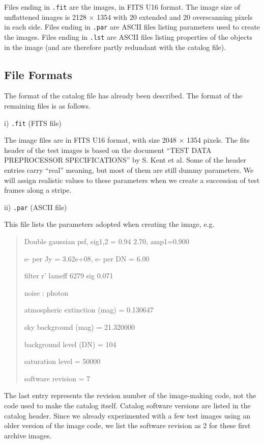 Files ending in {\tt .fit} are the images, in FITS U16 format.
The image size of unflattened images is 2128 $\times$
1354 with 20 extended and 20 overscanning pixels in each side.
Files ending in {\tt .par} are ASCII files listing
parameters used to create the images.  Files ending in {\tt .lst} 
are ASCII files listing properties of the objects in the image
(and are therefore partly redundant with the catalog file).


\vspace{10pt}
\subsection{File Formats}

The format of the catalog file has already been described.
The format of the remaining files is as follows.

\noindent
i) {\tt *.fit} (FITS file)

The image files are in FITS U16 format, with size 2048 $\times$ 1354 pixels.
The fits header of the test images is based on the document
``TEST DATA PREPROCESSOR SPECIFICATIONS''
by S. Kent et al.
Some of the header entries carry ``real'' meaning,
but most of them are still dummy parameters. We will assign realistic
values to these parameters when we create a succession of
test frames along a stripe.

\noindent
ii) {\tt *.par} (ASCII file)

\noindent
This file lists the parameters adopted when creating the image, e.g.\

\begin{quote}
Double gaussian psf, sig1,2 = 0.94 2.70, amp1=0.900

e- per Jy = 3.62e+08, e- per DN =  6.00

filter r'  lameff  6279  sig 0.071

noise : photon

atmospheric extinction (mag) = 0.130647

sky background (mag)         = 21.320000

background level (DN)        = 104

saturation level  = 50000

software revision = 7

\end{quote}
The last entry represents the revision number of the image-making code,
not the code used to make the catalog itself.  Catalog software versions
are listed in the catalog header.
Since we already experimented with a few test images using an older version of 
the image code, we list the software revision as 2 for these first
archive images.


